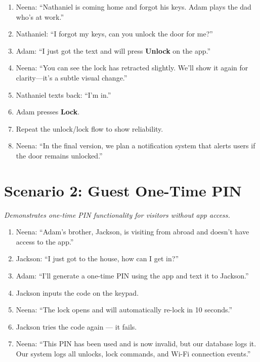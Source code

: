 \documentclass[12pt]{article}
\begin{document}
\begin{enumerate}[leftmargin=1.5em]
    \item Neena: “Nathaniel is coming home and forgot his keys. Adam plays the dad who’s at work.”
    \item Nathaniel: “I forgot my keys, can you unlock the door for me?”
    \item Adam: “I just got the text and will press \textbf{Unlock} on the app.”
    \item Neena: “You can see the lock has retracted slightly. We’ll show it again for clarity—it’s a subtle visual change.”
    \item Nathaniel texts back: “I’m in.”
    \item Adam presses \textbf{Lock}.
    \item Repeat the unlock/lock flow to show reliability.
    \item Neena: “In the final version, we plan a notification system that alerts users if the door remains unlocked.”
\end{enumerate}

\section{Scenario 2: Guest One-Time PIN}
\textit{Demonstrates one-time PIN functionality for visitors without app access.}

\begin{enumerate}
    \item Neena: “Adam’s brother, Jackson, is visiting from abroad and doesn’t have access to the app.”
    \item Jackson: “I just got to the house, how can I get in?”
    \item Adam: “I’ll generate a one-time PIN using the app and text it to Jackson.”
    \item Jackson inputs the code on the keypad.
    \item Neena: “The lock opens and will automatically re-lock in 10 seconds.”
    \item Jackson tries the code again — it fails.
    \item Neena: “This PIN has been used and is now invalid, but our database logs it. Our system logs all unlocks, lock commands, and Wi-Fi connection events.”
\end{enumerate}
\end{document}
